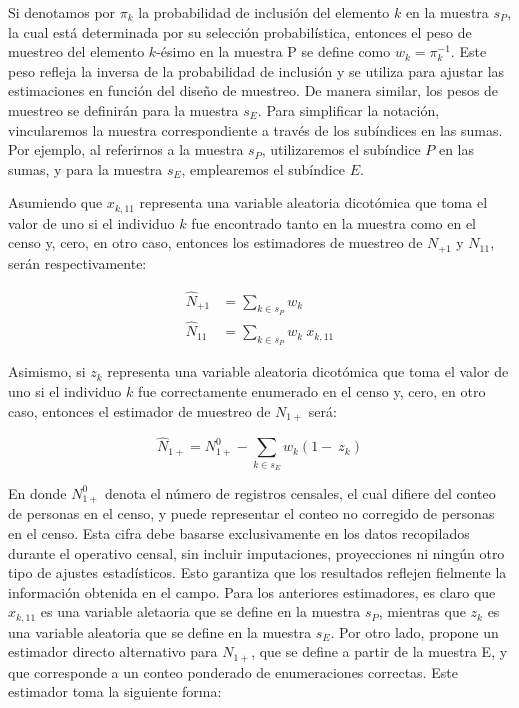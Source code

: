 \documentclass[
  12pt,
]{book}
\begin{document}
Si denotamos por \(\pi_k\) la probabilidad de inclusión del elemento \(k\) en la muestra \(s_P\), la cual está determinada por su selección probabilística, entonces el peso de muestreo del elemento \(k\)-ésimo en la muestra P se define como \(w_k = \pi_k^{-1}\). Este peso refleja la inversa de la probabilidad de inclusión y se utiliza para ajustar las estimaciones en función del diseño de muestreo. De manera similar, los pesos de muestreo se definirán para la muestra \(s_E\). Para simplificar la notación, vincularemos la muestra correspondiente a través de los subíndices en las sumas. Por ejemplo, al referirnos a la muestra \(s_P\), utilizaremos el subíndice \(P\) en las sumas, y para la muestra \(s_E\), emplearemos el subíndice \(E\).

Asumiendo que \(x_{k, 11}\) representa una variable aleatoria dicotómica que toma el valor de uno si el individuo \(k\) fue encontrado tanto en la muestra como en el censo y, cero, en otro caso, entonces los estimadores de muestreo de \({N}_{+1}\) y \({N}_{11}\), serán respectivamente:

\[
\begin{aligned}
\hat{N}_{+1} &= \sum_{k \in s_P} w_k \\
\hat{N}_{11} &= \sum_{k \in s_P} w_k \ x_{k, 11}
\end{aligned}
\]

Asimismo, si \(z_{k}\) representa una variable aleatoria dicotómica que toma el valor de uno si el individuo \(k\) fue correctamente enumerado en el censo y, cero, en otro caso, entonces el estimador de muestreo de \(N_{1+}\) será:

\[
\hat{N}_{1+} = {N}_{1+}^0 - \sum_{k \in s_E} w_k (1 - \ z_{k})
\]

En donde \({N}_{1+}^0\) denota el número de registros censales, el cual difiere del conteo de personas en el censo, y puede representar el conteo no corregido de personas en el censo. Esta cifra debe basarse exclusivamente en los datos recopilados durante el operativo censal, sin incluir imputaciones, proyecciones ni ningún otro tipo de ajustes estadísticos. Esto garantiza que los resultados reflejen fielmente la información obtenida en el campo. Para los anteriores estimadores, es claro que \(x_{k, 11}\) es una variable aletaoria que se define en la muestra \(s_P\), mientras que \(z_{k}\) es una variable aleatoria que se define en la muestra \(s_E\). Por otro lado, \citet{USCensusBureau_2022} propone un estimador directo alternativo para \({N}_{1+}\), que se define a partir de la muestra E, y que corresponde a un conteo ponderado de enumeraciones correctas. Este estimador toma la siguiente forma:
\end{document}
